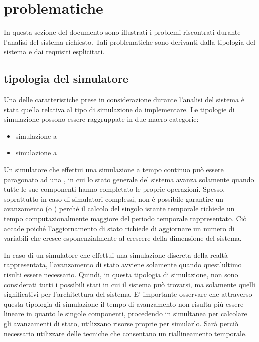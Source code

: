 %
\chapter*{problematiche}
\label{problematiche}
In questa sezione del documento sono illustrati i problemi riscontrati durante l'analisi del sistema richiesto. Tali problematiche sono derivanti dalla tipologia del sistema e dai requisiti esplicitati.

\section*{tipologia del simulatore}
\label{problematiche_tipologia_del_simulatore}
Una delle caratteristiche prese in considerazione durante l'analisi del sistema è stata quella relativa al tipo di simulazione da implementare. Le tipologie di simulazione possono essere raggruppate in due macro categorie:

\begin{itemize}
\item{simulazione a }
\item{simulazione a }
\end{itemize}

Un simulatore che effettui una simulazione a tempo continuo può essere paragonato ad una , in cui lo stato generale del sistema avanza solamente quando tutte le sue componenti hanno completato le proprie operazioni. Spesso, soprattutto in caso di simulatori complessi, non è possibile garantire un avanzamento  (o ) perché il calcolo del singolo istante temporale richiede un tempo computazionalmente maggiore del periodo temporale rappresentato. Ciò accade poiché l'aggiornamento di stato richiede di aggiornare un numero di variabili che cresce esponenzialmente al crescere della dimensione del sistema.

In caso di un simulatore che effettui una simulazione discreta della realtà rappresentata, l'avanzamento di stato avviene solamente quando quest'ultimo risulti essere necessario. Quindi, in questa tipologia di simulazione, non sono considerati tutti i possibili stati in cui il sistema può trovarsi, ma solamente quelli significativi per l'architettura del sistema. E' importante osservare che attraverso questa tipologia di simulazione il tempo di avanzamento non risulta più essere lineare in quanto le singole componenti, procedendo in simultanea per calcolare gli avanzamenti di stato, utilizzano risorse proprie per simularlo. Sarà perciò necessario utilizzare delle tecniche che consentano un riallineamento temporale.

